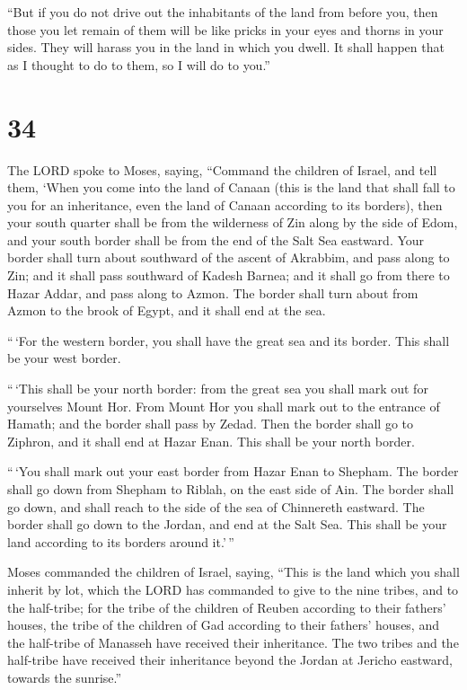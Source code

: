  ``But if you do not drive out the inhabitants of the land
from before you, then those you let remain of them will be like pricks
in your eyes and thorns in your sides. They will harass you in the land
in which you dwell.  It shall happen that as I thought to
do to them, so I will do to you.''

\hypertarget{section-33}{%
\section{34}\label{section-33}}

 The LORD spoke to Moses, saying,  ``Command the
children of Israel, and tell them, `When you come into the land of
Canaan (this is the land that shall fall to you for an inheritance, even
the land of Canaan according to its borders),  then your
south quarter shall be from the wilderness of Zin along by the side of
Edom, and your south border shall be from the end of the Salt Sea
eastward.  Your border shall turn about southward of the
ascent of Akrabbim, and pass along to Zin; and it shall pass southward
of Kadesh Barnea; and it shall go from there to Hazar Addar, and pass
along to Azmon.  The border shall turn about from Azmon to
the brook of Egypt, and it shall end at the sea.

 ``\,`For the western border, you shall have the great sea
and its border. This shall be your west border.

 ``\,`This shall be your north border: from the great sea
you shall mark out for yourselves Mount Hor.  From Mount Hor
you shall mark out to the entrance of Hamath; and the border shall pass
by Zedad.  Then the border shall go to Ziphron, and it shall
end at Hazar Enan. This shall be your north border.

 ``\,`You shall mark out your east border from Hazar Enan
to Shepham.  The border shall go down from Shepham to
Riblah, on the east side of Ain. The border shall go down, and shall
reach to the side of the sea of Chinnereth eastward.  The
border shall go down to the Jordan, and end at the Salt Sea. This shall
be your land according to its borders around it.'\,''

 Moses commanded the children of Israel, saying, ``This is
the land which you shall inherit by lot, which the LORD has commanded to
give to the nine tribes, and to the half-tribe;  for the
tribe of the children of Reuben according to their fathers' houses, the
tribe of the children of Gad according to their fathers' houses, and the
half-tribe of Manasseh have received their inheritance. 
The two tribes and the half-tribe have received their inheritance beyond
the Jordan at Jericho eastward, towards the sunrise.''

